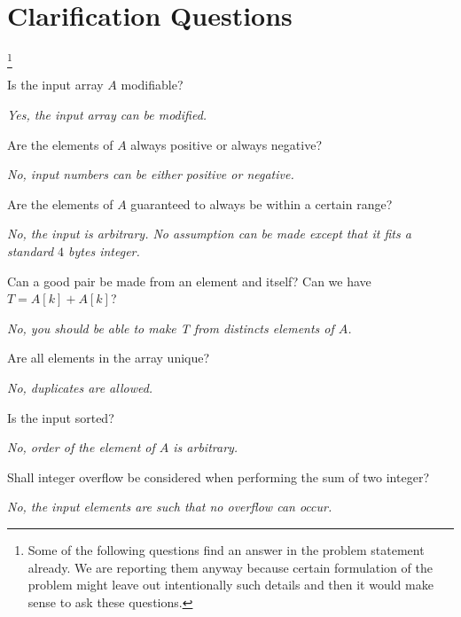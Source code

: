 \section{Clarification Questions}\footnote{Some of the following questions find an answer in the problem statement already. We are reporting them anyway because certain formulation of the problem might leave out intentionally such details and then it would make sense to ask these questions.}
\begin{QandA}
	\item Is the input array $A$ modifiable?
	\begin{answered}
		\textit{Yes, the input array can be modified.}
	\end{answered}
	
	\item Are the elements of $A$ always positive or always negative?
	\begin{answered}
		\textit{No, input numbers can be either positive or negative.}
	\end{answered}
	\item Are the elements of $A$ guaranteed to always be within a certain range?
	\begin{answered}
		\textit{No, the input is arbitrary. No assumption can be made except that it fits a standard $4$ bytes integer.}
	\end{answered}
	\item Can a good pair be made from an element and itself? Can we have $T = A[k] + A[k]$?
	\begin{answered}
		\textit{No, you should be able to make T from distincts elements of $A$.}
	\end{answered}
	\item Are all elements in the array unique?
	\begin{answered}
		\textit{No, duplicates are allowed.}
	\end{answered}
	\item Is the input sorted?
	\begin{answered}
		\textit{No, order of the element of $A$ is arbitrary.}
	\end{answered}
	\item Shall integer overflow be considered when performing the sum of two integer? 
	\begin{answered}
		\textit{No, the input elements are such that no overflow can occur.}
	\end{answered}
\end{QandA}




